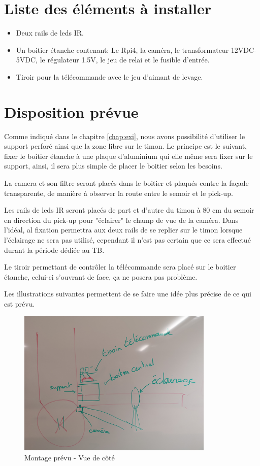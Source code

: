 \section{Liste des éléments à installer}
\begin{itemize}
    \item Deux rails de leds IR.
    \item Un boitier étanche contenant: Le Rpi4, la caméra, le transformateur 12VDC-5VDC, le régulateur 1.5V, le jeu de relai et le fusible d'entrée.
    \item Tiroir pour la télécommande avec le jeu d'aimant de levage.
\end{itemize}
\section{Disposition prévue}
Comme indiqué dans le chapitre \ref{chap:exi}, nous avons possibilité d'utiliser le support perforé ainsi que la zone libre sur le timon.
Le principe est le suivant, fixer le boitier étanche à une plaque d'aluminium qui elle même sera fixer sur le support, ainsi, il sera plus simple
de placer le boitier selon les besoins.

La camera et son filtre seront placés dans le boitier et plaqués contre la façade transparente, de manière à observer la route entre le semoir
et le pick-up.

Les rails de leds IR seront placés de part et d'autre du timon à 80 \si{\centi\metre} du semoir en direction du pick-up pour "éclairer" le champ
de vue de la caméra. Dans l'idéal, al fixation permettra aux deux rails de se replier sur le timon lorsque l'éclairage ne sera pas utilisé,
cependant il n'est pas certain que ce sera effectué durant la période dédiée au TB.

Le tiroir permettant de contrôler la télécommande sera placé sur le boitier étanche, celui-ci s'ouvrant de face, ça ne posera pas problème.

Les illustrations suivantes permettent de se faire une idée plus précise de ce qui est prévu.

\begin{figure}[H]
    \centering
    \includegraphics[height=7cm]{assets/figures/montage1.jpg}
    \caption{Montage prévu - Vue de côté}
\end{figure}


